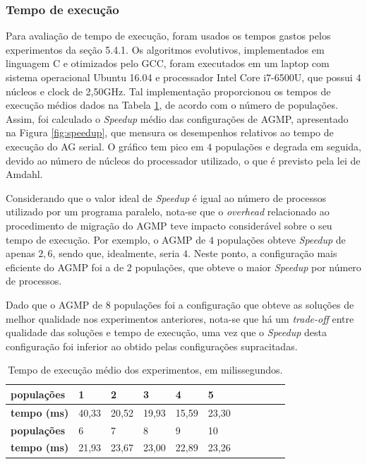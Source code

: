 \documentclass[fleqn,10pt]{SelfArx} %
\begin{document}
\subsubsection{Tempo de execução}

Para avaliação de tempo de execução, foram usados os tempos gastos pelos experimentos da seção 5.4.1.  
Os algoritmos evolutivos, implementados em linguagem C e otimizados pelo GCC, foram executados em um laptop com sistema operacional Ubuntu 16.04 e processador Intel Core i7-6500U, que possui $4$ núcleos e clock de 2,50GHz. Tal implementação proporcionou os tempos de execução médios dados na Tabela \ref{tab:time}, de acordo com o número de populações. Assim, foi calculado o \textit{Speedup} médio das configurações de AGMP, apresentado na Figura \ref{fig:speedup}, que mensura os desempenhos relativos ao tempo de execução do AG serial. O gráfico tem pico em $4$ populações e degrada em seguida, devido ao número de núcleos do processador utilizado, o que é previsto pela lei de Amdahl.

Considerando que o valor ideal de \textit{Speedup} é igual ao número de processos utilizado por um programa paralelo, nota-se que o \textit{overhead} relacionado ao procedimento de migração do AGMP teve impacto considerável sobre o seu tempo de execução. Por exemplo, o AGMP de $4$ populações obteve \textit{Speedup} de apenas $2,6$, sendo que, idealmente, seria $4$. Neste ponto, a configuração mais eficiente do AGMP foi a de $2$ populações, que obteve o maior \textit{Speedup} por número de processos.

Dado que o AGMP de 8 populações foi a configuração que obteve as soluções de melhor qualidade nos experimentos anteriores, nota-se que há um \textit{trade-off} entre qualidade das soluções e tempo de execução, uma vez que o \textit{Speedup} desta configuração foi inferior ao obtido pelas configurações supracitadas.

\begin{table}[h]
\centering
\caption{Tempo de execução médio dos experimentos, em milissegundos.}
\label{tab:time}
\begin{tabular}{|l|l|l|l|l|l|l|l|l|l|l|}
\hline
\textbf{populações} & 1     & 2     & 3     & 4     & 5     \\ \hline
\textbf{tempo (ms)} & 40,33 & 20,52 & 19,93 & 15,59 & 23,30 \\ \hline
\textbf{populações} & 6     & 7     & 8     & 9     & 10    \\ \hline
\textbf{tempo (ms)} & 21,93 & 23,67 & 23,00 & 22,89 & 23,26 \\ \hline
\end{tabular}
\end{table}
\end{document}
